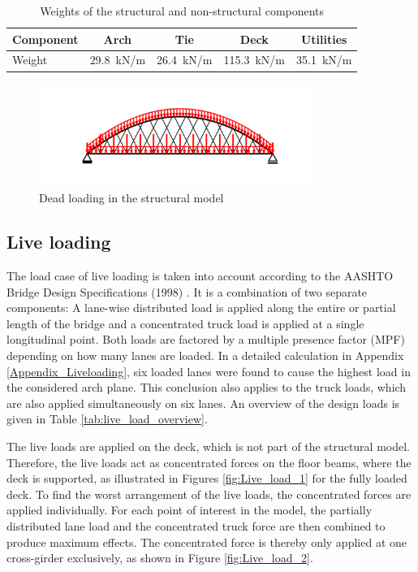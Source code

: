 \begin{table}[H]
    \centering
    \caption{Weights of the structural and non-structural components}
    \label{tab:dead_loads}
    \begin{tabular}{lcccc}
        \toprule
        Component & Arch & Tie & Deck & Utilities \\ \midrule
        Weight & \SI{29.8}{kN/m} & \SI{26.4}{kN/m} & \SI{115.3}{kN/m} & \SI{35.1}{kN/m} \\ \bottomrule
    \end{tabular}
\end{table}

\begin{figure}[H]
    \centering
    \includegraphics[trim={0 0.8cm 0 0.8cm},clip,
    width=0.8\textwidth]{illustrations/figures/permanent loads.png}
    \caption{Dead loading in the structural model}
    \label{fig:dead_loads}
\end{figure}

\subsection{Live loading} \label{sec:met_loads_live}
The load case of live loading is taken into account according to the AASHTO Bridge Design Specifications (1998) \cite{AASHTO}. It is a combination of two separate components: A lane-wise distributed load is applied along the entire or partial length of the bridge and a concentrated truck load is applied at a single longitudinal point. Both loads are factored by a multiple presence factor (MPF) depending on how many lanes are loaded. In a detailed calculation in Appendix \ref{Appendix_Liveloading}, six loaded lanes were found to cause the highest load in the considered arch plane. This conclusion also applies to the truck loads, which are also applied simultaneously on six lanes. An overview of the design loads is given in Table \ref{tab:live_load_overview}. 



The live loads are applied on the deck, which is not part of the structural model. Therefore, the live loads act as concentrated forces on the floor beams, where the deck is supported, as illustrated in Figures \ref{fig:Live_load_1} for the fully loaded deck. To find the worst arrangement of the live loads, the concentrated forces are applied individually. For each point of interest in the model, the partially distributed lane load and the concentrated truck force are then combined to produce maximum effects. The concentrated force is thereby only applied at one cross-girder exclusively, as shown in Figure \ref{fig:Live_load_2}. 


